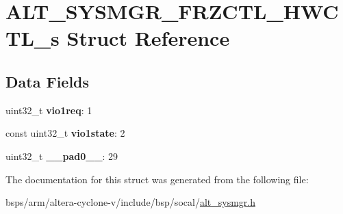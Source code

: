 \hypertarget{structALT__SYSMGR__FRZCTL__HWCTL__s}{}\section{A\+L\+T\+\_\+\+S\+Y\+S\+M\+G\+R\+\_\+\+F\+R\+Z\+C\+T\+L\+\_\+\+H\+W\+C\+T\+L\+\_\+s Struct Reference}
\label{structALT__SYSMGR__FRZCTL__HWCTL__s}
\subsection*{Data Fields}
\begin{DoxyCompactItemize}
\item 
\mbox{\label{structALT__SYSMGR__FRZCTL__HWCTL__s_ad0873830939bfb2fe0d1434daba6bb00}} 
uint32\+\_\+t {\bfseries vio1req}\+: 1
\item 
\mbox{\label{structALT__SYSMGR__FRZCTL__HWCTL__s_a52db9dc0e9d9f9be606a858f2667b6c3}} 
const uint32\+\_\+t {\bfseries vio1state}\+: 2
\item 
\mbox{\label{structALT__SYSMGR__FRZCTL__HWCTL__s_a431c093702e1b5ca1ba5943a39fe8bf5}} 
uint32\+\_\+t {\bfseries \+\_\+\+\_\+pad0\+\_\+\+\_\+}\+: 29
\end{DoxyCompactItemize}


The documentation for this struct was generated from the following file\+:\begin{DoxyCompactItemize}
\item 
bsps/arm/altera-\/cyclone-\/v/include/bsp/socal/\mbox{\hyperlink{alt__sysmgr_8h}{alt\+\_\+sysmgr.\+h}}\end{DoxyCompactItemize}
